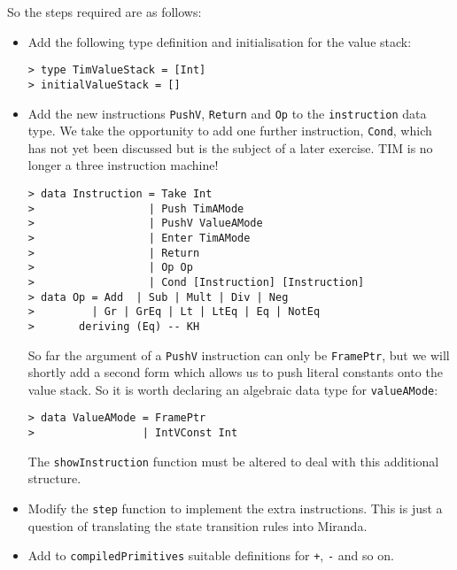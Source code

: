So the steps required are as follows:
\begin{itemize}
\item
Add the following type definition and initialisation for the value stack:
\begin{verbatim}
> type TimValueStack = [Int]
> initialValueStack = []
\end{verbatim}
%
%
\item
Add the new instructions \mbox{\tt PushV}, \mbox{\tt Return} and \mbox{\tt Op}
to the \mbox{\tt instruction} data type.  We take the opportunity to add
one further instruction,
\mbox{\tt Cond}, which has not yet been discussed but is the subject
of a later exercise.
TIM is no longer a three instruction machine!
\begin{verbatim}
> data Instruction = Take Int
>                  | Push TimAMode
>                  | PushV ValueAMode
>                  | Enter TimAMode
>                  | Return
>                  | Op Op
>                  | Cond [Instruction] [Instruction]
> data Op = Add  | Sub | Mult | Div | Neg
>         | Gr | GrEq | Lt | LtEq | Eq | NotEq
>       deriving (Eq) -- KH
\end{verbatim}
%
%
%
%
%
%
%
%
%
%
%
%
%
%
%
%
%
%
So far the argument of a \mbox{\tt PushV} instruction can only be \mbox{\tt FramePtr},
but we will shortly add a second form which allows us to push literal
constants onto the value stack.  So it is worth declaring an algebraic
data type for \mbox{\tt valueAMode}:
\begin{verbatim}
> data ValueAMode = FramePtr
>                 | IntVConst Int
\end{verbatim}
%
%
The \mbox{\tt showInstruction} function must be altered to deal with this additional
structure.

\item
Modify the \mbox{\tt step} function to implement the extra instructions.  This is
just a question of translating the state transition rules into Miranda.

\item
Add to \mbox{\tt compiledPrimitives} suitable definitions for \mbox{\tt +}, \mbox{\tt -} and so on.


\end{itemize}
